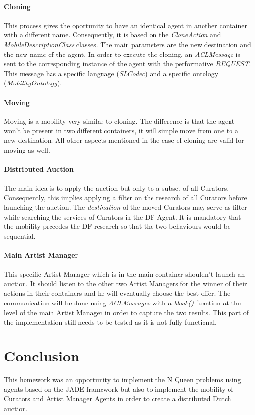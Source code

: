 \documentclass[a4paper,11pt]{article}
\begin{document}
  \paragraph{Cloning}

  This process gives the oportunity to have an identical agent in another container with a different
  name. Consequently, it is based on the \textit{CloneAction} and \textit{MobileDescriptionClass} classes.
  The main parameters are the new destination and the new name of the agent.
  In order to execute the cloning, an \textit{ACLMessage} is sent to the corresponding instance of the agent
  with the performative \textit{REQUEST}. This message has a specific language (\textit{SLCodec}) and a specific
  ontology (\textit{MobilityOntology}).

  \paragraph{Moving}

  Moving is a mobility very similar to cloning. The difference is that the agent won't be present in
  two different containers, it will simple move from one to a new destination. All other aspects mentioned
  in the case of cloning are valid for moving as well.

  \paragraph{Distributed Auction}

  The main idea is to apply the auction but only to a subset of all Curators. Consequently, this implies
  applying a filter on the research of all Curators before launching the auction. The \textit{destination}
  of the moved Curators may serve as filter while searching the services of Curators in the DF Agent. It is
  mandatory that the mobility precedes the DF research so that the two behaviours would be sequential.

  \paragraph{Main Artist Manager}
  This specific Artist Manager which is in the main container shouldn't launch an auction. It should listen
  to the other two Artist Managers for the winner of their actions in their containers and he will eventually
  choose the best offer. The communication will be done using \textit{ACLMessages} with a \textit{block()}
  function at the level of the main Artist Manager in order to capture the two results. This part
  of the implementation still needs to be tested as it is not fully functional.

  \section{Conclusion}
  
  This homework was an opportunity to implement the N Queen problems using agents based on the JADE framework
  but also to implement the mobility of Curators and Artist Manager Agents in order to create a distributed
  Dutch auction.
\end{document}
